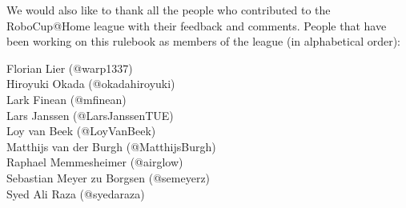 \noindent We would also like to thank all the people who contributed to the RoboCup@Home league with their feedback and comments.
People that have been working on this rulebook as members of the league (in alphabetical order):
\begin{center}
    \begin{minipage}{0.8\textwidth}
        \begin{multicols}{2}%
            \footnotesize
            \noindent%
            Florian Lier (@warp1337)\\
            Hiroyuki Okada (@okadahiroyuki)\\
            Lark Finean (@mfinean)\\
            Lars Janssen (@LarsJanssenTUE)\\
            \columnbreak%
            Loy van Beek (@LoyVanBeek)\\
            Matthijs van der Burgh (@MatthijsBurgh)\\
            Raphael Memmesheimer (@airglow)\\
            Sebastian Meyer zu Borgsen (@semeyerz)\\
            Syed Ali Raza (@syedaraza)
        \end{multicols}
    \end{minipage}
\end{center}


